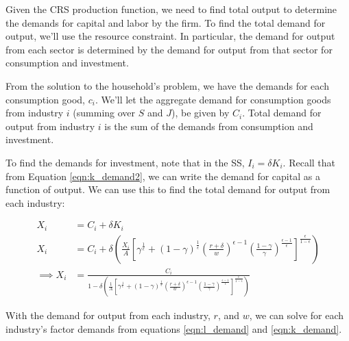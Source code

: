 \documentclass[letterpaper,12pt]{article}
\theoremstyle{definition}
\begin{document}
\begin{spacing}{1.5}
Given the CRS production function, we need to find total output to determine the demands for capital and labor by the firm.  To find the total demand for output, we'll use the resource constraint.  In particular, the demand for output from each sector is determined by the demand for output from that sector for consumption and investment.

From the solution to the household's problem, we have the demands for each consumption good, $c_{i}$.  We'll let the aggregate demand for consumption goods from industry $i$ (summing over $S$ and $J$), be given by $C_{i}$.  Total demand for output from industry $i$ is the sum of the demands from consumption and investment.

To find the demands for investment, note that in the SS, $I_{i}=\delta K_{i}$.  Recall that from Equation \ref{eqn:k_demand2}, we can write the demand for capital as a function of output.  We can use this to find the total demand for output from each industry:

\begin{equation}
\label{eqn:find_output}
\begin{split}
X_{i} &= C_{i} + \delta K_{i} \\
X_{i} &= C_{i} + \delta \left( \frac{X_{i}}{A}\left[\gamma^{\frac{1}{\epsilon}}+(1-\gamma)^{\frac{1}{\epsilon}}\left(\frac{r+\delta}{w}\right)^{\epsilon-1}\left(\frac{1-\gamma}{\gamma}\right)^{\frac{\epsilon-1}{\epsilon}}\right]^{\frac{\epsilon}{1-\epsilon}}\right)\\
\implies X_{i} &= \frac{C_{i}}{1-\delta\left( \frac{1}{A}\left[\gamma^{\frac{1}{\epsilon}}+(1-\gamma)^{\frac{1}{\epsilon}}\left(\frac{r+\delta}{w}\right)^{\epsilon-1}\left(\frac{1-\gamma}{\gamma}\right)^{\frac{\epsilon-1}{\epsilon}}\right]^{\frac{\epsilon}{1-\epsilon}}\right)}
\end{split}
\end{equation}  

With the demand for output from each industry, $r$, and $w$, we can solve for each industry's factor demands from equations \ref{eqn:l_demand} and \ref{eqn:k_demand}.


\end{spacing}
\end{document}
